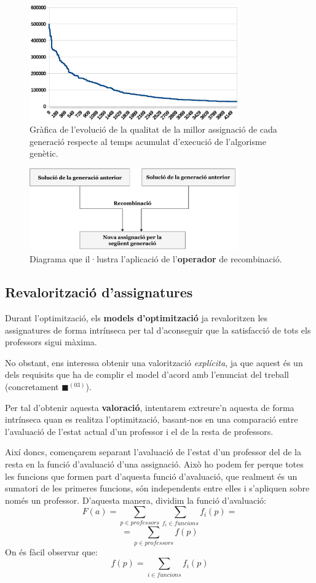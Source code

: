 \documentclass[10pt,twocolumn]{article}
\begin{document}
\begin{figure}[!]
	\centering
	\includegraphics[width=9cm]{progress_ga}
	\caption{ \small Gràfica de l'evolució de la qualitat de la millor assignació de cada generació respecte al temps  acumulat d'execució de l'algorisme genètic.}
	\label{fio}
\end{figure}
\begin{figure}[ht]
	\centering
	\includegraphics[width=9cm]{recombinacio}
	\caption{ \small Diagrama que il·lustra l'aplicació de l'\textbf{operador} de recombinació. }
	\label{firo}
\end{figure}
\subsection{Revalorització d'assignatures}
Durant l'optimització, els \textbf{models d'optimització} ja revaloritzen les assignatures de forma intrínseca per tal d'aconseguir que la satisfacció de tots els professors sigui màxima. 

No obstant, ens interessa obtenir una valorització \textit{explícita}, ja que aquest és un dels requisits que ha de complir el model d'acord amb l'enunciat del treball (concretament {\color{green!60}$\blacksquare$}$^{(03)}$).

Per tal d'obtenir aquesta \textbf{valoració}, intentarem extreure'n aquesta de forma intrínseca quan es realitza l'optimització, basant-nos en una comparació entre l'avaluació de l'estat actual d'un professor i el de la resta de professors.

Així doncs, començarem separant l'avaluació de l'estat d'un professor del de la resta en la funció d'avaluació d'una assignació. Això ho podem fer perque totes les funcions que formen part d'aquesta funció d'avaluació, que realment és un sumatori de les primeres funcions, són independents entre elles i s'apliquen sobre només un professor. D'aquesta manera, dividim la funció d'avaluació:
$$F(a)= \displaystyle \sum_{p\in professors} \sum_{f_i\in funcions} f_i(p) = $$
$$= \displaystyle \sum_{p\in professors} f(p)$$
On és fàcil observar que:
$$f(p)=\sum_{i\in funcions} f_i(p)$$
\end{document}
